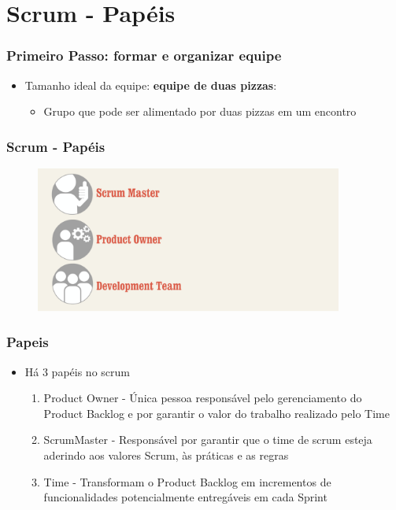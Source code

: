 \section{Scrum - Papéis}
\begin{frame}
 \frametitle{Primeiro Passo: formar e organizar equipe}
 \begin{itemize}
  \item Tamanho ideal da equipe: \textbf{equipe de duas pizzas}:
  \begin{itemize}
   \item Grupo que pode ser alimentado por duas pizzas em um encontro
  \end{itemize}
 \end{itemize}
\end{frame}

\begin{frame}
 \frametitle{Scrum - Papéis}
  \begin{figure}
   \centering
   \includegraphics[width = 0.9\textwidth]{figs/scrum_papeis.png}
  \end{figure}
\end{frame}

\begin{frame}
 \frametitle{Papeis}
 \begin{itemize}
  \item Há 3 papéis no scrum
  \begin{enumerate}
   \item Product Owner - Única pessoa responsável pelo gerenciamento do Product Backlog e por garantir o valor do trabalho realizado pelo Time
   \item ScrumMaster - Responsável por garantir que o time de scrum esteja aderindo aos valores Scrum, às práticas e as regras
   \item Time - Transformam o Product Backlog em incrementos de funcionalidades potencialmente entregáveis em cada Sprint
  \end{enumerate}
 \end{itemize}
\end{frame}

